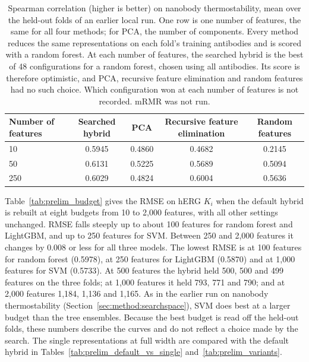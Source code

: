 \begin{table}[htbp]
\centering
\small
\begin{tabular}{@{}lcccc@{}}
\toprule
Number of features & Searched hybrid & PCA & Recursive feature elimination & Random features \\
\midrule
10 & 0.5945 & 0.4860 & 0.4682 & 0.2145 \\
50 & 0.6131 & 0.5225 & 0.5689 & 0.5094 \\
250 & 0.6029 & 0.4824 & 0.6004 & 0.5636 \\
\bottomrule
\end{tabular}
\caption[The searched hybrid against PCA, recursive feature elimination and random features on nanobody thermostability]{Spearman correlation (higher is better) on nanobody thermostability, mean over the held-out folds of an earlier local run. One row is one number of features, the same for all four methods; for PCA, the number of components. Every method reduces the same representations on each fold's training antibodies and is scored with a random forest. At each number of features, the searched hybrid is the best of 48 configurations for a random forest, chosen using all antibodies. Its score is therefore optimistic, and PCA, recursive feature elimination and random features had no such choice. Which configuration won at each number of features is not recorded. mRMR was not run.}
\label{tab:prelim_reduction_nanobody}
\end{table}

Table~\ref{tab:prelim_budget} gives the RMSE on hERG $K_i$ when the default hybrid is rebuilt at eight budgets from 10 to 2,000 features, with all other settings unchanged. RMSE falls steeply up to about 100 features for random forest and LightGBM, and up to 250 features for SVM. Between 250 and 2,000 features it changes by 0.008 or less for all three models. The lowest RMSE is at 100 features for random forest (0.5978), at 250 features for LightGBM (0.5870) and at 1,000 features for SVM (0.5733). At 500 features the hybrid held 500, 500 and 499 features on the three folds; at 1,000 features it held 793, 771 and 790; and at 2,000 features 1,184, 1,136 and 1,165. As in the earlier run on nanobody thermostability (Section~\ref{sec:method:searchspace}), SVM does best at a larger budget than the tree ensembles. Because the best budget is read off the held-out folds, these numbers describe the curves and do not reflect a choice made by the search. The single representations at full width are compared with the default hybrid in Tables~\ref{tab:prelim_default_vs_single} and~\ref{tab:prelim_variants}.

